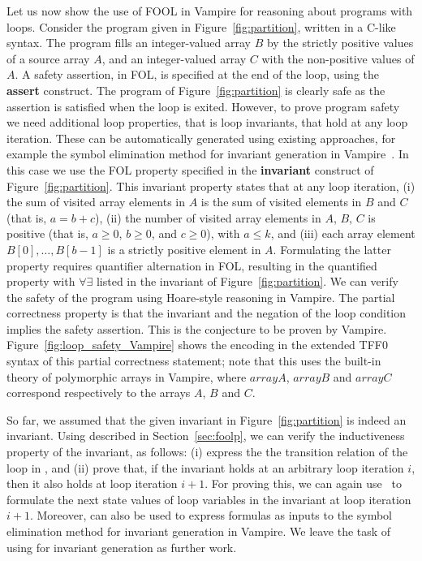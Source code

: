 Let us now show the use of FOOL in Vampire for reasoning about
programs with loops. Consider the program given in
Figure~\ref{fig:partition}, written in a C-like syntax.  The program
fills an integer-valued array $B$ by the strictly positive values
of a source array $A$, and an integer-valued array $C$ with
the non-positive values of $A$. A safety assertion, in FOL, is
specified at the end of the loop, using the {\bf assert}
construct. The program of Figure~\ref{fig:partition} is clearly safe
as the assertion is satisfied when the loop is exited.
However, to prove program safety we need additional
loop properties, that is loop invariants, that hold at any loop
iteration. These can be automatically generated using existing approaches, for
example the symbol elimination method for invariant generation in
Vampire~\cite{fase2009}. In this case we use the FOL property
specified in the {\bf invariant} construct of  Figure~\ref{fig:partition}. This invariant
property states that at any loop iteration, (i) the  sum of visited
array elements in $A$ is the sum of visited elements in $B$ and $C$
(that is, $a = b + c$), (ii) the number of visited array
elements in $A$, $B$, $C$ is positive (that is, $a\geq 0$, $b\geq 0$,
and $c\geq 0$), with $a\leq k$, and (iii) each array element
$B[0],\ldots,B[b-1]$ is a strictly positive element in
$A$. Formulating the latter property requires quantifier alternation
in FOL, resulting in the quantified property with $\forall\exists$
listed in the invariant of  Figure~\ref{fig:partition}.
We can verify the safety of the program using Hoare-style reasoning in Vampire.
The partial correctness property is that the invariant and the negation of the loop condition implies the safety assertion.
This is the conjecture to be proven by Vampire.
Figure~\ref{fig:loop_safety_Vampire} shows the encoding in the
extended TFF0 syntax of this partial
correctness statement; note that this uses the built-in theory of
polymorphic arrays in Vampire, where $arrayA$, $arrayB$ and $arrayC$
correspond respectively to the arrays $A$, $B$ and $C$.

So far, we assumed that the given invariant in
Figure~\ref{fig:partition} is
indeed an invariant. Using \foolp{} described in
Section~\ref{sec:foolp}, we can verify the inductiveness
property of the invariant, as follows: (i) express the the transition
relation of the loop in \foolp, and (ii) prove that, if the invariant
holds at an arbitrary loop iteration $i$, then it also holds at loop
iteration $i+1$. For proving this, we can again use \foolp\ to
formulate
the next state values of loop variables in the invariant at loop
iteration $i+1$.
Moreover, \foolp{} can also be used to express formulas as
inputs to the symbol elimination method for invariant generation in
Vampire. We leave the task of using \foolp{} for invariant generation
as further work.
